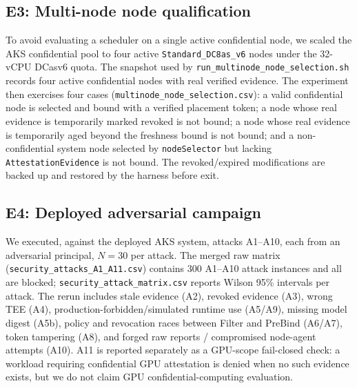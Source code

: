 \subsection{E3: Multi-node node qualification}
\label{sec:e3-multinode}
To avoid evaluating a scheduler on a single active confidential node, we scaled
the AKS confidential pool to four active \texttt{Standard\_DC8as\_v6} nodes under
the 32-vCPU DCasv6 quota. The snapshot used by
\texttt{run\_multinode\_node\_selection.sh} records four active confidential
nodes with real verified evidence. The experiment then exercises four cases
(\texttt{multinode\_node\_selection.csv}): a valid confidential node is selected
and bound with a verified placement token; a node whose real evidence is
temporarily marked revoked is not bound; a node whose real evidence is
temporarily aged beyond the freshness bound is not bound; and a non-confidential
system node selected by \texttt{nodeSelector} but lacking
\texttt{AttestationEvidence} is not bound. The revoked/expired modifications are
backed up and restored by the harness before exit.

\subsection{E4: Deployed adversarial campaign}
\label{sec:e2}
We executed, against the deployed AKS system, attacks A1--A10, each from an
adversarial principal, $N{=}30$ per attack. The merged raw matrix
(\texttt{security\_attacks\_A1\_A11.csv}) contains 300 A1--A10 attack instances
and all are blocked; \texttt{security\_attack\_matrix.csv} reports Wilson 95\%
intervals per attack. The rerun includes stale evidence (A2), revoked evidence
(A3), wrong TEE (A4), production-forbidden/simulated runtime use (A5/A9), missing
model digest (A5b), policy and revocation races between Filter and PreBind
(A6/A7), token tampering (A8), and forged raw reports / compromised node-agent
attempts (A10). A11 is reported separately as a GPU-scope fail-closed check: a
workload requiring confidential GPU attestation is denied when no such evidence
exists, but we do not claim GPU confidential-computing evaluation.

